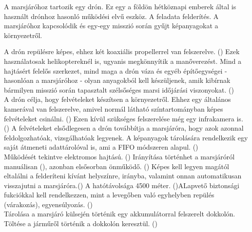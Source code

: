 \documentclass[12pt]{report}
\begin{document}
A marsjáróhoz tartozik egy drón. Ez egy a földön hétköznapi emberek által is használt drónhoz hasonló működési elvű eszköz. A feladata felderítés. A marsjáróhoz kapcsolódik és egy-egy misszió során gyűjt képanyagokat a környezetről.

A drón repülésre képes, ehhez két koaxiális propellerrel van felszerelve. () Ezek használatosak helikoptereknél is, ugyanis megkönnyítik a manőverezést. Mind a hajtásért felelős szerkezet, mind maga a drón váza és egyéb építőegységei - hasonlóan a marsjáróhoz - olyan anyagokból kell készüljenek, amik kibírnak bármilyen misszió során tapasztalt szélsőséges marsi időjárási viszonyokat. ()\\

A drón célja, hogy felvételeket készítsen a környezetről. Ehhez egy általános kamerával van felszerelve, amivel normál látható színtartományban képes felvételeket csinálni. () Ezen kívül szükséges felszerelése még egy infrakamera is. () A felvételeket elsődlegesen a drón továbbítja a marsjáróra, hogy azok azonnal feldolgozhatóak, vizsgálhatóak legyenek. A képanyagok tárolására rendelkezik egy saját átmeneti adattárolóval is, ami a FIFO módszeren alapul. ()\\

Működését tekintve elektromos hajtású. () Irányítása történhet a marsjáróról manuálisan (), azonban elsősorban önműködő. () Képes kell legyen magától eltalálni a felderíteni kívánt helyszínre, irányba, valamint onnan automatikusan visszajutni a marsjáróra.() A hatótávolsága 4500 méter. ()ALapvető biztonsági fukciókkal kell rendelkezzen, mint a levegőben való egyhelyben repülés (várakozás), egyensúlyozás. ()\\

Tárolása a marsjáró külsején történik egy akkumulátorral felszerelt dokkolón. Töltése a járműről történik a dokkolón keresztül. ()
\end{document}
